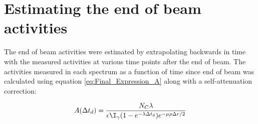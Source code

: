\section{Estimating the end of beam activities}
The end of beam activities were estimated by extrapolating backwards in time with the measured activities at various time points after the end of beam. The activities measured in each spectrum as a function of time since end of beam was calculated using equation \ref{eq:Final_Expression_A} along with a self-attenuation correction:

\begin{equation} \label{eq:activity_eob_matlab}
    A(\Delta t_d) = \frac{N_C\lambda}{\epsilon\I_\gamma (1-e^{-\lambda \Delta t_d})e^{-\mu\rho\Delta r/2}}
\end{equation}


